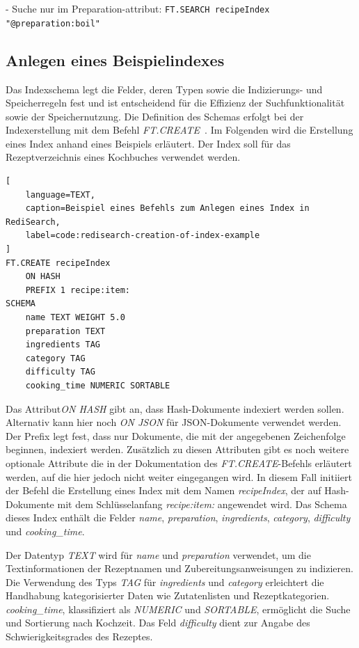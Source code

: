 - Suche nur im Preparation-attribut: \texttt{FT.SEARCH recipeIndex "@preparation:boil"}




\subsection{Anlegen eines Beispielindexes}
Das Indexschema legt die Felder, deren Typen sowie die Indizierungs- und Speicherregeln fest und ist entscheidend für die Effizienz der Suchfunktionalität sowie der Speichernutzung.
Die Definition des Schemas erfolgt bei der Indexerstellung mit dem Befehl \emph{FT.CREATE}~\cite{redis_ltd_ftcreate_nodate}.
Im Folgenden wird die Erstellung eines Index anhand eines Beispiels erläutert.
Der Index soll für das Rezeptverzeichnis eines Kochbuches verwendet werden.

\begin{lstlisting}[
    language=TEXT,
    caption=Beispiel eines Befehls zum Anlegen eines Index in RediSearch,
    label=code:redisearch-creation-of-index-example
]
FT.CREATE recipeIndex
    ON HASH
    PREFIX 1 recipe:item:
SCHEMA
    name TEXT WEIGHT 5.0
    preparation TEXT
    ingredients TAG
    category TAG
    difficulty TAG
    cooking_time NUMERIC SORTABLE
\end{lstlisting}

Das Attribut\emph{ON HASH} gibt an, dass Hash-Dokumente indexiert werden sollen. Alternativ kann hier noch \emph{ON JSON} für JSON-Dokumente verwendet werden.
Der Prefix legt fest, dass nur Dokumente, die mit der angegebenen Zeichenfolge beginnen, indexiert werden. Zusätzlich zu diesen Attributen gibt es noch weitere optionale Attribute die in der Dokumentation des \emph{FT.CREATE}-Befehls erläutert werden, auf die hier jedoch nicht weiter eingegangen wird.
In diesem Fall initiiert der Befehl die Erstellung eines Index mit dem Namen \emph{recipeIndex}, der auf Hash-Dokumente mit dem Schlüsselanfang \emph{recipe:item:} angewendet wird. 
Das Schema dieses Index enthält die Felder \emph{name}, \emph{preparation}, \emph{ingredients}, \emph{category}, \emph{difficulty} und \emph{cooking\_time}.

Der Datentyp \emph{TEXT} wird für \emph{name} und \emph{preparation} verwendet, um die Textinformationen der Rezeptnamen und Zubereitungsanweisungen zu indizieren. Die Verwendung des Typs \emph{TAG} für \emph{ingredients} und \emph{category} erleichtert die Handhabung kategorisierter Daten wie Zutatenlisten und Rezeptkategorien. \emph{cooking\_time}, klassifiziert als \emph{NUMERIC} und \emph{SORTABLE}, ermöglicht die Suche und Sortierung nach Kochzeit. Das Feld \emph{difficulty} dient zur Angabe des Schwierigkeitsgrades des Rezeptes.

